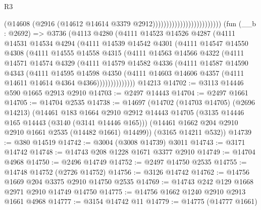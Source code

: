 \begin{lexlean}{R3}
\begin{coremodule}
                                                (@14608
                                                  (@2916
                                                    (@14612
                                                      @14614
                                                      @3379
                                                      @2912)))))))))))))))))))))))))
    (fun (__b : @2692) =>
    @3736
      (@4113
        @4280
        (@4111
          @14523
          @14526
          @4287
          (@4111
            @14531
            @14534
            @4294
            (@4111
              @14539
              @14542
              @4301
              (@4111
                @14547
                @14550
                @4308
                (@4111
                  @14555
                  @14558
                  @4315
                  (@4111
                    @14563
                    @14566
                    @4322
                    (@4111
                      @14571
                      @14574
                      @4329
                      (@4111
                        @14579
                        @14582
                        @4336
                        (@4111
                          @14587
                          @14590
                          @4343
                          (@4111
                            @14595
                            @14598
                            @4350
                            (@4111
                              @14603
                              @14606
                              @4357
                              (@4111 @14611 @14614 @4364 @4366))))))))))))))
    @14213
@14702 := @3113 @14446 @590 @1665 @2913 @2910
@14703 := @2497 @14443
@14704 := @2497 @1661
@14705 := @14704 @2535
@14738 := @14697
    (@14702
      (@14703 @14705)
      (@2696 @14213)
      (@14461
        @183
        @1664
        @2910
        @2912
        @14443
        @14705
        (@3135 @14446 @165 @14443 (@3140 (@3141 @14446 @165)))
        (@14461 @1662 @204 @2910 @2910 @1661 @2535 (@14482 @1661) @14499))
      (@3165 @14211 @532))
@14739 := @380 @14519
@14742 := @3004 (@3008 @14739) @3011
@14743 := @3171 @14742
@14748 := @14743 @208 @1228 @1671 @3377 @2910
@14749 := @14704 @4968
@14750 := @2496 @14749
@14752 := @2497 @14750 @2535
@14755 := @14748 @14752 (@2726 @14752)
@14756 := @3126 @14742
@14762 := @14756 @1669 @204 @3375 @2910 @14750 @2535
@14769 := @14743 @242 @129 @1668 @2971 @2910 @14749 @14750
@14775 := @14756 @1662 @1240 @2910 @2913 @1661 @4968
@14777 := @3154 @14742 @11
@14779 := @14775 (@14777 @1661)

\end{coremodule}
\end{lexlean}
